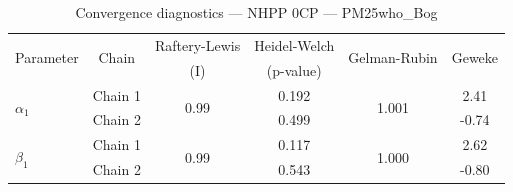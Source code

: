 \begin{table}[H]
\centering
\caption{Convergence diagnostics — NHPP 0CP — PM25who_Bog}
\begin{tabular}{lccccc}
\toprule
\multirow{2}{*}{Parameter} & \multirow{2}{*}{Chain} & Raftery-Lewis & Heidel-Welch & \multirow{2}{*}{Gelman-Rubin} & \multirow{2}{*}{Geweke} \\
 & & (I) & (p-value) & & (z) \\
\midrule
\multirow{2}{*}{$\alpha_1$} & Chain 1 & \multirow{2}{*}{0.99} & 0.192 & \multirow{2}{*}{1.001} & 2.41 \\
 & Chain 2 & & 0.499 & & -0.74 \\
\midrule
\multirow{2}{*}{$\beta_1$} & Chain 1 & \multirow{2}{*}{0.99} & 0.117 & \multirow{2}{*}{1.000} & 2.62 \\
 & Chain 2 & & 0.543 & & -0.80 \\
\bottomrule
\end{tabular}
\end{table}
